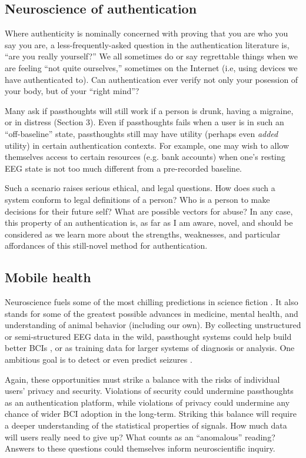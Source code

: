 \documentclass[sigconf]{acmart}
\begin{document}
\subsection{Neuroscience of authentication}
\label{sec:orgf8773ab}

Where authenticity is nominally concerned with proving that you are who you say you are,
a less-frequently-asked question in the authentication literature is,
``are you really yourself?''
We all sometimes do or say regrettable things when we are feeling ``not quite ourselves,'' sometimes on the Internet (i.e, using devices we have authenticated to).
Can authentication ever verify not only your posession of your body, but of your ``right mind''?

Many ask if passthoughts will still work if a person is drunk, having a migraine, or in distress (Section 3). 
Even if passthoughts fails when a user is in such an ``off-baseline'' state, 
passthoughts still may have utility (perhaps even \emph{added} utility) in certain authentication contexts.
For example, one may wish to allow themselves access to certain resources (e.g. bank accounts) when one's resting EEG state is not too much different from a pre-recorded baseline.

Such a scenario raises serious ethical, and legal questions. 
How does such a system conform to legal definitions of a person?
Who is a person to make decisions for their future self?
What are possible vectors for abuse?
In any case, this property of an authentication is, as far as I am aware, novel, and should be considered as we learn more about the strengths, weaknesses, and particular affordances of this still-novel method for authentication.
\subsection{Mobile health}
\label{sec:orgb63fb70}
Neuroscience fuels some of the most chilling predictions in science fiction \cite{Welsh2011}.
It also stands for some of the greatest possible advances in medicine, mental health, and understanding of animal behavior (including our own).
By collecting unstructured or semi-structured EEG data in the wild, 
passthought systems could help build better BCIs \cite{Grierson2011a},
or as training data for larger systems of diagnosis or analysis. 
One ambitious goal is to detect or even predict seizures \cite{Mormann2006}.

Again, these opportunities must strike a balance with the risks of individual users' privacy and security.
Violations of security could undermine passthoughts as an authentication platform,
while violations of privacy could undermine any chance of wider BCI adoption in the long-term.
Striking this balance will require a deeper understanding of the statistical properties of signals. 
How much data will users really need to give up? 
What counts as an ``anomalous'' reading?
Answers to these questions could themselves inform neuroscientific inquiry.
\end{document}
